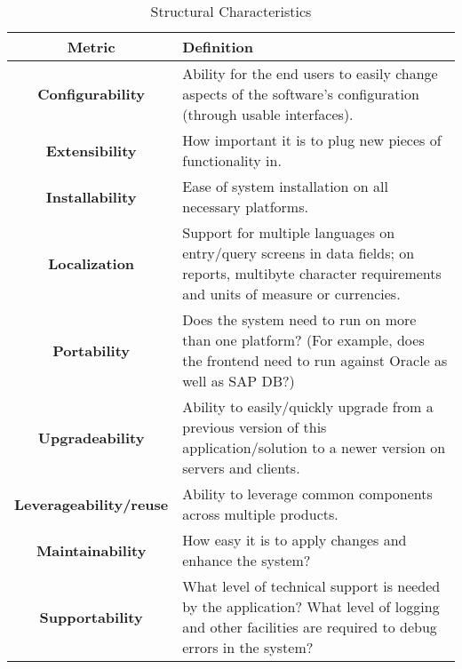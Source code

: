 \documentclass[11pt]{scrartcl} %
\begin{document}
\begin{table}
  \centering
  \begin{tabular}{|c|p{8cm}|}
    \hline
    \textbf{Metric} & \textbf{Definition} \\ \hline
    \textbf{Configurability} & Ability for the end users to easily change aspects of the software’s configuration (through usable interfaces). \\ \hline
    \textbf{Extensibility} & How important it is to plug new pieces of functionality in. \\ \hline
    \textbf{Installability} & Ease of system installation on all necessary platforms. \\ \hline
    \textbf{Localization} & Support for multiple languages on entry/query screens in data fields; on reports, multibyte character requirements and units of measure or currencies. \\ \hline
    \textbf{Portability} & Does the system need to run on more than one platform? (For example, does the frontend need to run against Oracle as well as SAP DB?) \\ \hline
    \textbf{Upgradeability} & Ability to easily/quickly upgrade from a previous version of this application/solution to a newer version on servers and clients. \\ \hline
    \textbf{Leverageability/reuse} & Ability to leverage common components across multiple products. \\ \hline
    \textbf{Maintainability} & How easy it is to apply changes and enhance the system? \\ \hline
    \textbf{Supportability} & What level of technical support is needed by the application? What level of logging and other facilities are required to debug errors in the system? \\ \hline
    \end{tabular}
    \caption{Structural Characteristics}
\end{table}
\end{document}
